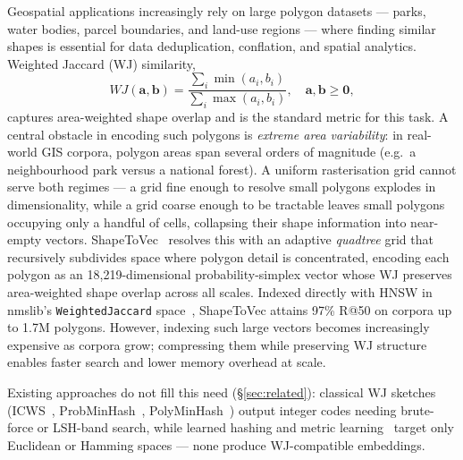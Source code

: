 \documentclass[sigconf]{acmart}
\begin{document}
Geospatial applications increasingly rely on large polygon datasets --- parks,
water bodies, parcel boundaries, and land-use regions --- where finding similar
shapes is essential for data deduplication, conflation, and spatial analytics.
Weighted Jaccard (WJ) similarity,
\begin{equation}
  WJ(\mathbf{a},\mathbf{b}) = \frac{\sum_i \min(a_i,b_i)}{\sum_i \max(a_i,b_i)},
  \quad \mathbf{a},\mathbf{b} \geq \mathbf{0},
  \label{eq:wj}
\end{equation}
captures area-weighted shape overlap and is the standard metric for this task.
A central obstacle in encoding such polygons is \emph{extreme area variability}:
in real-world GIS corpora, polygon areas span several orders of magnitude (e.g.\
a neighbourhood park versus a national forest). A uniform rasterisation grid
cannot serve both regimes --- a grid fine enough to resolve small polygons
explodes in dimensionality, while a grid coarse enough to be tractable leaves
small polygons occupying only a handful of cells, collapsing their shape
information into near-empty vectors. ShapeToVec~\cite{shape2vec} resolves this
with an adaptive \emph{quadtree} grid that recursively subdivides space where
polygon detail is concentrated, encoding each polygon as an 18{,}219-dimensional
probability-simplex vector whose WJ preserves area-weighted shape overlap across
all scales. Indexed directly with HNSW in nmslib's
\texttt{WeightedJaccard} space~\cite{shape2vec}, ShapeToVec attains 97\% R@50 on corpora
up to 1.7M polygons. However, indexing such large vectors becomes increasingly
expensive as corpora grow; compressing them while preserving WJ structure
enables faster search and lower memory overhead at scale.

Existing approaches do not fill this need (\S\ref{sec:related}): classical WJ
sketches (ICWS~\cite{ioffe10}, ProbMinHash~\cite{probminhash20},
PolyMinHash~\cite{polyminhash25}) output integer codes needing brute-force or
LSH-band search, while learned hashing and metric
learning~\cite{hashsurvey14,deephashsurvey22} target only Euclidean or Hamming
spaces --- none produce WJ-compatible embeddings.
\end{document}
